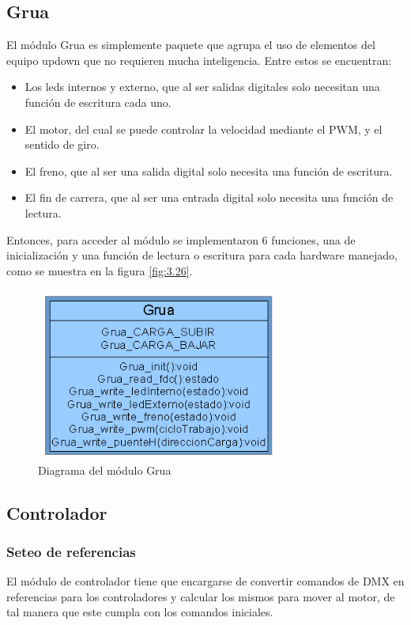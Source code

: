 \subsection{Grua}
El módulo Grua es simplemente paquete que agrupa el uso de elementos del equipo updown que no requieren mucha inteligencia. Entre estos se encuentran: 
\begin{itemize}
	\item Los leds internos y externo, que al ser salidas digitales solo necesitan una función de escritura cada uno.
	\item El motor, del cual se puede controlar la velocidad mediante el PWM, y el sentido de giro.
	\item El freno, que al ser una salida digital solo necesita una función de escritura.
	\item El fin de carrera, que al ser una entrada digital solo necesita una función de lectura.
\end{itemize} 

Entonces, para acceder al módulo se implementaron 6 funciones, una de inicialización y una función de lectura o escritura para cada hardware manejado, como se muestra en la figura \ref{fig:3.26}.

\begin{figure}[!ht]
	\centering
	\includegraphics[width=8cm,scale=1]{resources/3_26-moduloGrua.png}
	\caption{Diagrama del módulo Grua}
	\label{fig:\thefigure}
\end{figure}

\subsection{Controlador}
\subsubsection{Seteo de referencias}
El módulo de controlador tiene que encargarse de convertir comandos de DMX en referencias para los controladores y calcular los mismos para mover al motor, de tal manera que este cumpla con los comandos iniciales.

